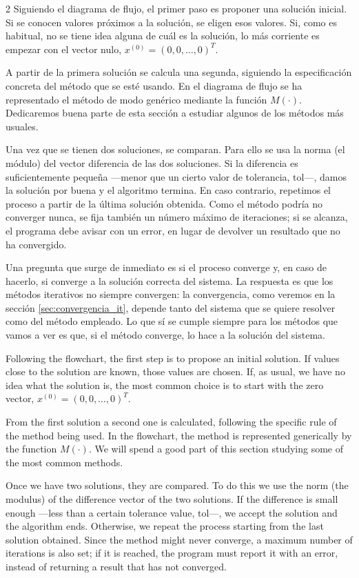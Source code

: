 \begin{paracol}{2}
Siguiendo el diagrama de flujo, el primer paso es proponer una solución inicial. Si se conocen valores próximos a la solución, se eligen esos valores. Si, como es habitual, no se tiene idea alguna de cuál es la solución, lo más corriente es empezar con el vector nulo, $x^{(0)}=(0, 0, \dots, 0)^T$.

A partir de la primera solución se calcula una segunda, siguiendo la especificación concreta del método que se esté usando. En el diagrama de flujo se ha representado el método de modo genérico mediante la función $M(\cdot)$. Dedicaremos buena parte de esta sección a estudiar algunos de los métodos más usuales.

Una vez que se tienen dos soluciones, se comparan. Para ello se usa la norma (el módulo) del vector diferencia de las dos soluciones. Si la diferencia es suficientemente pequeña ---menor que un cierto valor de tolerancia, $\text{tol}$---, damos la solución por buena y el algoritmo termina. En caso contrario, repetimos el proceso a partir de la última solución obtenida. Como el método podría no converger nunca, se fija también un número máximo de iteraciones; si se alcanza, el programa debe avisar con un error, en lugar de devolver un resultado que no ha convergido.

Una pregunta que surge de inmediato es si el proceso converge y, en caso de hacerlo, si converge a la solución correcta del sistema. La respuesta es que los métodos iterativos no siempre convergen: la convergencia, como veremos en la sección \ref{sec:convergencia_it}, depende tanto del sistema que se quiere resolver como del método empleado. Lo que sí se cumple siempre para los métodos que vamos a ver es que, si el método converge, lo hace a la solución del sistema.

\switchcolumn
Following the flowchart, the first step is to propose an initial solution. If values close to the solution are known, those values are chosen. If, as usual, we have no idea what the solution is, the most common choice is to start with the zero vector, $x^{(0)}=(0, 0, \dots, 0)^T$.

From the first solution a second one is calculated, following the specific rule of the method being used. In the flowchart, the method is represented generically by the function $M(\cdot)$. We will spend a good part of this section studying some of the most common methods.

Once we have two solutions, they are compared. To do this we use the norm (the modulus) of the difference vector of the two solutions. If the difference is small enough ---less than a certain tolerance value, $\text{tol}$---, we accept the solution and the algorithm ends. Otherwise, we repeat the process starting from the last solution obtained. Since the method might never converge, a maximum number of iterations is also set; if it is reached, the program must report it with an error, instead of returning a result that has not converged.


\end{paracol}
